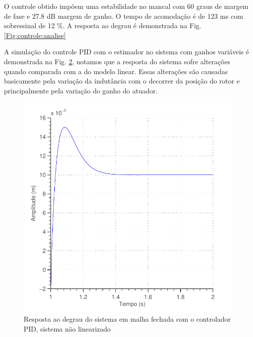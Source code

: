 O controle obtido impõem uma estabilidade no mancal com 60 graus de margem de fase e 27.8 dB margem de ganho. O tempo de acomodação é de 123 ms com sobressinal de 12 \%. A resposta ao degrau é demonstrada na Fig. \ref{Fig:controle:analise}

\begin{figure}[ht!]
\centering

\label{fig:controle:degrau}
\end{figure}

A simulação do controle PID com o estimador no sistema com ganhos variáveis é demonstrada na Fig. \ref{fig:pid_nlinear_degrau}, notamos que a resposta do sistema sofre alterações quando comparada com a do modelo linear. Essas alterações são causadas basicamente pela variação da indutância com o decorrer da posição do rotor e principalmente pela variação do ganho do atuador.

\begin{figure}
\centering
\includegraphics[width=0.7\linewidth]{Figs/controle/pid_nlinear_degrau}
\caption{Resposta ao degrau do sistema em malha fechada com o controlador PID, sistema não linearizado}
\label{fig:pid_nlinear_degrau}
\end{figure}

